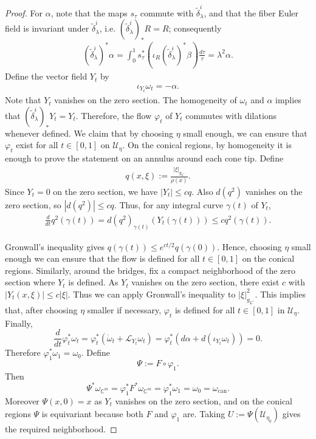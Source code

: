 \documentclass[11pt]{amsart}
\theoremstyle{definition}
\theoremstyle{remark}
\begin{document}
\begin{proof}
For $\alpha$, note that the maps \(s_\tau\) commute
with \(\widetilde\delta^i_\lambda\), and that the fiber Euler field is invariant under
\(\widetilde\delta^i_\lambda\), i.e.
\((\widetilde\delta^i_\lambda)_*R=R\); consequently
\begin{align*}
    (\widetilde\delta^i_\lambda)^*\alpha
=\int_0^1 s_\tau^*
\left(\iota_R (\widetilde\delta^i_\lambda)^*\beta\right)\frac{d\tau}{\tau}
=\lambda^2\alpha.
\end{align*}
Define the vector field $Y_t$ by
\begin{align*}
    \iota_{Y_t}\omega_t=-\alpha.
\end{align*}
Note that $Y_t$ vanishes on the zero section. The homogeneity of $\omega_t$ and $\alpha$ implies that $(\widetilde\delta^i_\lambda)_*Y_t=Y_t$. Therefore, the flow $\varphi_t$ of $Y_t$ commutes with dilations whenever defined. We claim that by choosing $\eta$ small enough, we can ensure that $\varphi_t$ exist for all $t\in [0,1]$ on $\mathcal{U}_\eta$. On the conical regions, by homogeneity it is enough to prove the statement on an annulus around each cone tip. Define
\begin{align*}
    q(x,\xi):=\frac{\lvert \xi\rvert_{g_{L^\varepsilon}}}{\rho(x)}.
\end{align*}
Since \(Y_t=0\) on the zero
section, we have \(|Y_t|\le cq\). Also \(d(q^2)\) vanishes on the zero section, so \(|d(q^2)|\le cq\).
Thus, for any integral curve \(\gamma(t)\) of \(Y_t\),
\begin{align*}
    \frac{d}{dt}q^2(\gamma(t))
=d(q^2)_{\gamma(t)}(Y_t(\gamma(t)))
\le cq^2(\gamma(t)).
\end{align*}

Gronwall's inequality gives \(q(\gamma(t))\le e^{ct/2}q(\gamma(0))\). Hence, choosing $\eta$ small enough we can ensure that the flow is defined for all $t\in [0,1]$ on the conical regions. Similarly, around the bridges, fix a compact neighborhood of the zero section where $Y_t$ is defined. As $Y_t$ vanishes on the zero section, there exist $c$ with $\lvert Y_t(x,\xi)\rvert\leq c\lvert \xi\rvert$. Thus we can apply Gronwall's inequality to $\lvert \xi\rvert_{g_{L^\varepsilon}}^2$. This implies that, after choosing $\eta$ smaller if necessary, $\varphi_t$ is defined for all $t\in [0,1]$ in $\mathcal{U}_\eta$.\\
Finally,
\[
\frac{d}{dt}\varphi_t^*\omega_t
=
\varphi_t^*(\dot\omega_t+\mathcal L_{Y_t}\omega_t)
=
\varphi_t^*(d\alpha+d(\iota_{Y_t}\omega_t))=0.
\]
Therefore \(\varphi_1^*\omega_1=\omega_0\). Define
\[
\Psi:=F\circ\varphi_1.
\]
Then
\[
\Psi^*\omega_{\mathbb{C}^m}=\varphi_1^*F^*\omega_{\mathbb{C}^m}=\varphi_1^*\omega_1=\omega_0=\omega_\mathrm{can}.
\]
Moreover \(\Psi(x,0)=x\) as $Y_t$ vanishes on the zero section, and on the conical regions \(\Psi\) is equivariant
because both \(F\) and \(\varphi_1\) are. Taking
\(U:=\Psi(\mathcal U_{\eta_0})\) gives the required neighborhood.    
\end{proof}
\end{document}
